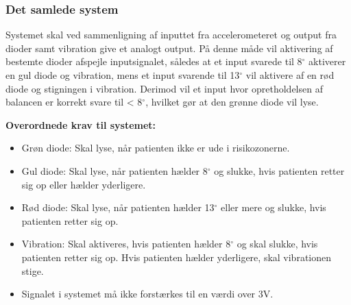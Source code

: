 \subsubsection{Det samlede system}
Systemet skal ved sammenligning af inputtet fra accelerometeret og output fra dioder samt vibration give et analogt output. På denne måde vil aktivering af bestemte dioder afspejle inputsignalet, således at et input svarede til 8$^{\circ}$ aktiverer en gul diode og vibration, mens et input svarende til 13$^{\circ}$ vil aktivere af en rød diode og stigningen i vibration. Derimod vil et input hvor opretholdelsen af balancen er korrekt svare til < 8$^{\circ}$, hvilket gør at den grønne diode vil lyse. 

\textbf{Overordnede krav til systemet:}
\begin{itemize}
\item Grøn diode: Skal lyse, når patienten ikke er ude i risikozonerne.  
\item Gul diode: Skal lyse, når patienten hælder 8$^{\circ}$ og slukke, hvis patienten retter sig op eller hælder yderligere.
\item Rød diode: Skal lyse, når patienten hælder 13$^{\circ}$ eller mere og slukke, hvis patienten retter sig op.
\item Vibration: Skal aktiveres, hvis patienten hælder 8$^{\circ}$ og skal slukke, hvis patienten retter sig op. Hvis patienten hælder yderligere, skal vibrationen stige.
\item Signalet i systemet må ikke forstærkes til en værdi over 3V.
\end{itemize}



%
%
%
%
%
%

